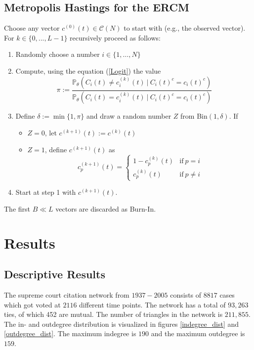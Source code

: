 \documentclass[headsepline=true, abstracton]{scrartcl}
\begin{document}
\subsection*{Metropolis Hastings for the ERCM}\label{networksimulation}
Choose any vector $c^{(0)}(t) \in \mathcal{C}(N)$ to start with (e.g., the observed vector). For $k \in \{0,...,L-1\}$ recursively proceed as follows:\\
\begin{enumerate}
\item Randomly choose a number $i\in \{1,\dots, N\}$
\item Compute, using the equation (\ref{Logit}) the value
$$\pi := \dfrac{\mathbb{P}_{\theta}(C_{i}(t) \neq c_{i}^{(k)}(t) ~| ~C_i(t)^c=c_i(t)^c)}{\mathbb{P}_{\theta}(C_{i}(t) = c_{i}^{(k)}(t) ~| ~C_i(t)^c=c_i(t)^c)}$$
\item Define $\delta:= \min\{1, \pi\}$ and draw a random number $Z$ from Bin$(1, \delta)$. If
\begin{itemize}
\item $Z=0$, let $c^{(k+1)}(t) := c^{(k)}(t)$ 
\item $Z=1$, define $c^{(k+1)}(t)$ as
$$c_{p}^{(k+1)}(t)=\begin{cases}
1-c_{p}^{(k)}(t)& \text{if}~ p=i \\
c_{p}^{(k)}(t) &\text{if}~ p \neq i 
\end{cases}$$
\end{itemize}
\item Start at step 1 with $c^{(k+1)}(t)$.
\end{enumerate}
The first $B \ll L$ vectors are discarded as Burn-In.


 \section*{Results}
  \subsection*{Descriptive Results}
The supreme court citation network from $1937 - 2005$ consists of $8817$ cases which got voted at $2116$ different time points. The network has a total of $93,263$ ties, of which 452 are mutual. The number of triangles in the network is $211,855$. The in- and outdegree distribution is visualized in figures \ref{indegree_dist} and \ref{outdegree_dist}. The maximum indegree is $190$ and the maximum outdegree is $159$.
\end{document}
